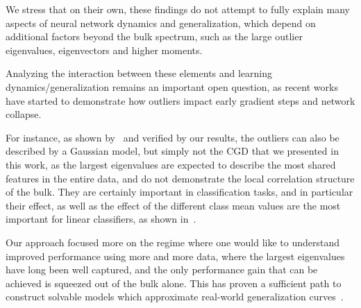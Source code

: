 \documentclass{article}
\begin{document}
We stress that on their own, these findings do not attempt to fully explain many aspects of neural network dynamics and generalization, which depend on additional factors beyond the bulk spectrum, such as the large outlier eigenvalues, eigenvectors and higher moments. 

Analyzing the interaction between these elements and learning dynamics/generalization remains an important open question, as recent works have started to demonstrate how outliers impact early gradient steps and network collapse.

For instance, as shown by~\cite{seddik2020random} and verified by our results, the outliers can also be described by a Gaussian model, but simply not the CGD that we presented in this work, as the largest eigenvalues are expected to describe the most shared features in the entire data, and do not demonstrate the local correlation structure of the bulk. They are certainly important in classification tasks, and in particular their effect, as well as the effect of the different class mean values are the most important for linear classifiers, as shown in~\cite{Saxe_2019}.


Our approach focused more on the regime where one would like to understand improved performance using more and more data, where the largest eigenvalues have long been well captured, and the only performance gain that can be achieved is squeezed out of the bulk alone. This has proven a sufficient path to construct solvable models which approximate real-world generalization curves~\cite{kaplan2020scaling,maloney2022solvable,MeiMontanari2022}. 
\end{document}
